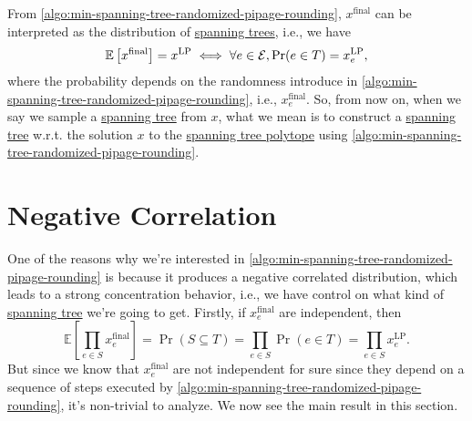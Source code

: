 From \autoref{algo:min-spanning-tree-randomized-pipage-rounding}, \(x^{\text{final} }\) can be interpreted as the distribution of \hyperref[def:spanning-tree]{spanning trees}, i.e., we have
\[
	\mathbb{E}\left[x^{\text{final} } \right] = x^{\text{LP} } \iff \forall e\in \mathcal{\MakeUppercase{e}}, \Pr(e\in T) = x_e^{\text{LP} },
\]
where the probability depends on the randomness introduce in \autoref{algo:min-spanning-tree-randomized-pipage-rounding}, i.e., \(x_e^{\text{final} } \). So, from now on, when we say we sample a \hyperref[def:spanning-tree]{spanning tree} from \(x\), what we mean is to construct a \hyperref[def:spanning-tree]{spanning tree} w.r.t. the solution \(x\) to the \hyperref[eq:spanning-tree-polytope]{spanning tree polytope} using \autoref{algo:min-spanning-tree-randomized-pipage-rounding}.

\section{Negative Correlation}
One of the reasons why we're interested in \autoref{algo:min-spanning-tree-randomized-pipage-rounding} is because it produces a negative correlated distribution, which leads to a strong concentration behavior, i.e., we have control on what kind of \hyperref[def:spanning-tree]{spanning tree} we're going to get. Firstly, if \(x_e^{\text{final} } \) are independent, then
\[
	\mathbb{E}\left[\prod_{e\in S} x^{\text{final} }_e \right] = \Pr(S \subseteq T) = \prod_{e\in S} \Pr(e\in T) = \prod_{e\in S} x^{\text{LP} }_e.
\]
But since we know that \(x_e^{\text{final} }\) are not independent for sure since they depend on a sequence of steps executed by \autoref{algo:min-spanning-tree-randomized-pipage-rounding}, it's non-trivial to analyze. We now see the main result in this section.

